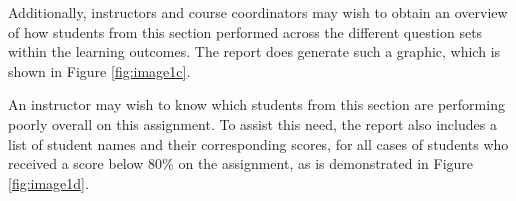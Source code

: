 \documentclass{article}\usepackage[]{graphicx}\usepackage[]{color}
\numberwithin{equation}{section} %
\begin{document}
Additionally, instructors and course coordinators may wish to obtain an overview of how students from this section performed across the different question sets within the learning outcomes. The report does generate such a graphic, which is shown in Figure \ref{fig:image1c}. 

\begin{center}
\captionsetup{width=0.65\textwidth}
\label{fig:image1c}
\end{center}

An instructor may wish to know which students from this section are performing poorly overall on this assignment. To assist this need, the report also includes a list of student names and their corresponding scores, for all cases of students who received a score below 80\% on the assignment, as is demonstrated in Figure \ref{fig:image1d}.

\begin{center}
\captionsetup{width=0.85\textwidth}
\label{fig:image1d}
\end{center}
\end{document}

